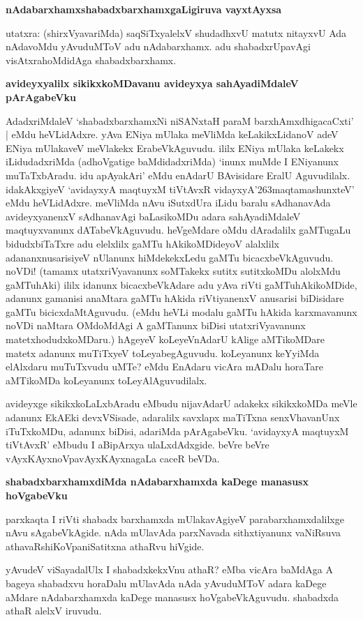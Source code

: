 {\bf nAdabarxhamxshabadxbarxhamxgaLigiruva vayxtAyxsa}

utatxra: (shirxVyavariMda) saqSiTxyalelxV shudadhxvU matutx nitayxvU Ada nAdavoMdu yAvuduMToV adu nAdabarxhamx. adu shabadxrUpavAgi visAtxrahoMdidAga shabadxbarxhamx.

{\bf avideyxyalilx sikikxkoMDavanu avideyxya sahAyadiMdaleV pArAgabeVku}

AdadxriMdaleV `shabadxbarxhamxNi niSANxtaH paraM barxhAmxdhigacaCxti' | eMdu heVLidAdxre. yAva ENiya mUlaka meVliMda keLakikxLidanoV adeV ENiya mUlakaveV meVlakekx ErabeVkAguvudu. ililx ENiya mUlaka keLakekx iLidudadxriMda (adhoVgatige baMdidadxriMda) `inunx muMde I ENiyanunx muTaTxbAradu. idu apAyakAri' eMdu enAdarU BAvisidare EralU Aguvudilalx. idakAkxgiyeV `avidayxyA maqtuyxM tiVtAvxR vidayxyA\char'263maqtamashunxteV' eMdu heVLidAdxre. meVliMda nAvu iSutxdUra iLidu baralu sAdhanavAda avideyxyanenxV sAdhanavAgi baLasikoMDu adara sahAyadiMdaleV maqtuyxvanunx dATabeVkAguvudu. heVgeMdare oMdu dAradalilx gaMTugaLu bidudxbiTaTxre adu elelxlilx gaMTu hAkikoMDideyoV alalxlilx adananxnusarisiyeV nUlanunx hiMdekekxLedu gaMTu bicacxbeVkAguvudu. noVDi! (tamamx utatxriVyavanunx soMTakekx sutitx sutitxkoMDu alolxMdu gaMTuhAki) ililx idanunx bicacxbeVkAdare adu yAva riVti gaMTuhAkikoMDide, adanunx gamanisi anaMtara gaMTu hAkida riVtiyanenxV anusarisi biDisidare gaMTu bicicxdaMtAguvudu. (eMdu heVLi modalu gaMTu hAkida karxmavanunx noVDi naMtara OMdoMdAgi A gaMTanunx biDisi utatxriVyavanunx matetxhodudxkoMDaru.) hAgeyeV koLeyeVnAdarU kAlige aMTikoMDare matetx adanunx muTiTxyeV toLeyabegAguvudu. koLeyanunx keYyiMda elAlxdaru muTuTxvudu uMTe? eMdu EnAdaru vicAra mADalu horaTare aMTikoMDa koLeyanunx toLeyAlAguvudilalx.

avideyxge sikikxkoLaLxbAradu eMbudu nijavAdarU adakekx sikikxkoMDa meVle adanunx EkAEki devxVSisade, adaralilx savxlapx maTiTxna senxVhavanUnx iTuTxkoMDu, adanunx biDisi, adariMda pArAgabeVku. `avidayxyA maqtuyxM tiVtAvxR' eMbudu I aBipArxya ulaLxdAdxgide. beVre beVre vAyxKAyxnoVpavAyxKAyxnagaLa caceR beVDa.

{\bf shabadxbarxhamxdiMda nAdabarxhamxda kaDege manasusx hoVgabeVku}

parxkaqta I riVti shabadx barxhamxda mUlakavAgiyeV parabarxhamxdalilxge nAvu sAgabeVkAgide. nAda mUlavAda parxNavada sithxtiyanunx vaNiRsuva athavaRshiKoVpaniSatitxna athaRvu hiVgide.

yAvudeV viSayadalUlx I shabadxkekxVnu athaR? eMba vicAra baMdAga A bageya shabadxvu horaDalu mUlavAda nAda yAvuduMToV adara kaDege aMdare nAdabarxhamxda kaDege manasusx hoVgabeVkAguvudu. shabadxda athaR alelxV iruvudu.

